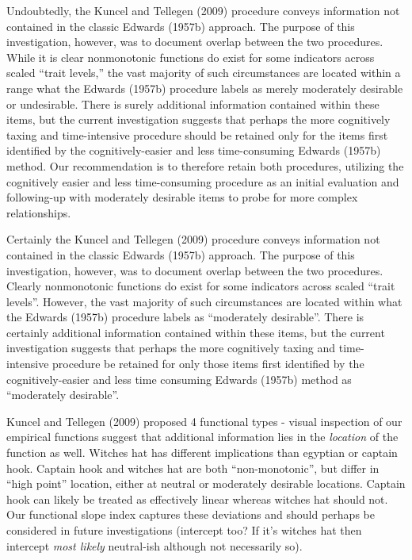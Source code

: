 \documentclass[
  ,jou]{apa6}
\begin{document}
Undoubtedly, the Kuncel and Tellegen (2009) procedure conveys information not contained in the classic Edwards (1957b) approach. The purpose of this investigation, however, was to document overlap between the two procedures. While it is clear nonmonotonic functions do exist for some indicators across scaled ``trait levels,'' the vast majority of such circumstances are located within a range what the Edwards (1957b) procedure labels as merely moderately desirable or undesirable. There is surely additional information contained within these items, but the current investigation suggests that perhaps the more cognitively taxing and time-intensive procedure should be retained only for the items first identified by the cognitively-easier and less time-consuming Edwards (1957b) method. Our recommendation is to therefore retain both procedures, utilizing the cognitively easier and less time-consuming procedure as an initial evaluation and following-up with moderately desirable items to probe for more complex relationships.

Certainly the Kuncel and Tellegen (2009) procedure conveys information not contained in the classic Edwards (1957b) approach. The purpose of this investigation, however, was to document overlap between the two procedures. Clearly nonmonotonic functions do exist for some indicators across scaled ``trait levels''. However, the vast majority of such circumstances are located within what the Edwards (1957b) procedure labels as ``moderately desirable''. There is certainly additional information contained within these items, but the current investigation suggests that perhaps the more cognitively taxing and time-intensive procedure be retained for only those items first identified by the cognitively-easier and less time consuming Edwards (1957b) method as ``moderately desirable''.

Kuncel and Tellegen (2009) proposed 4 functional types - visual inspection of our empirical functions suggest that additional information lies in the \emph{location} of the function as well. Witches hat has different implications than egyptian or captain hook. Captain hook and witches hat are both ``non-monotonic'', but differ in ``high point'' location, either at neutral or moderately desirable locations. Captain hook can likely be treated as effectively linear whereas witches hat should not. Our functional slope index captures these deviations and should perhaps be considered in future investigations (intercept too? If it's witches hat then intercept \emph{most likely} neutral-ish although not necessarily so).
\end{document}
